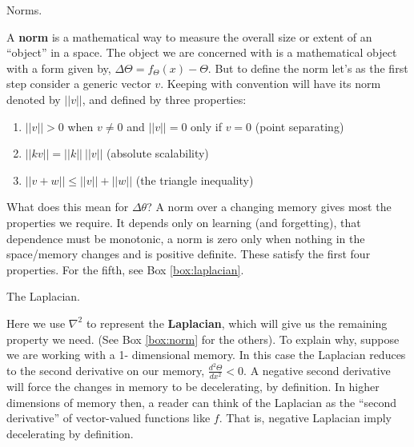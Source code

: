 \begin{featurebox}
\caption{Norms.}
\label{box:norm}
A \textbf{norm} is a mathematical way to measure the overall size or extent of an ``object'' in a space. The object we are concerned with is a mathematical object with a form given by, $\Delta \Theta = f_{\Theta}(x) - \Theta$. But to define the norm let's as the first step consider a generic vector $v$. Keeping with convention will have its norm denoted by $||v||$, and defined by three properties:

\begin{enumerate}
  \item $||v|| > 0$ when $v \neq 0$ and $||v|| = 0$ only if $v=0$ (point separating)
  \item $||k v|| = ||k||\ ||v||$ (absolute scalability)
  \item $||v + w|| \leq ||v|| + ||w||$ (the triangle inequality)
\end{enumerate}

What does this mean for $\Delta \theta$? A norm over a changing memory gives most the properties we require. It depends only on learning (and forgetting), that dependence must be monotonic, a norm is zero only when nothing in the space/memory changes and is positive definite. These satisfy the first four properties. For the fifth, see Box \ref{box:laplacian}.
\medskip
\end{featurebox}

\begin{featurebox}
	\caption{The Laplacian.}
	\label{box:laplacian}
	Here we use $\nabla^2$ to represent the \textbf{Laplacian}, which will give us the remaining property we need. (See Box \ref{box:norm} for the others). To explain why, suppose we are working with a 1- dimensional memory. In this case the Laplacian reduces to the second derivative on our memory, $\frac{d^2\Theta}{dx^2} < 0$. A negative second derivative will force the changes in memory to be decelerating, by definition. In higher dimensions of memory then, a reader can think of the Laplacian as the ``second derivative'' of vector-valued functions like $f$. That is, negative Laplacian imply decelerating by definition.
	\medskip
\end{featurebox}


